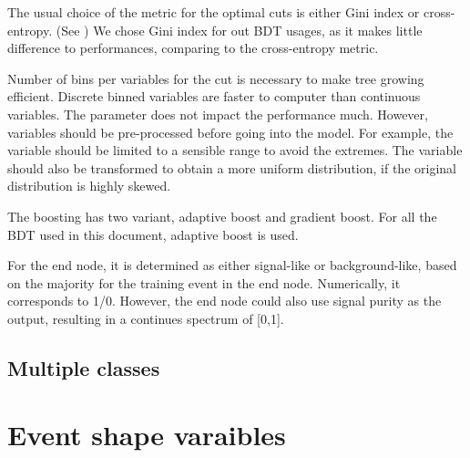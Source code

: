 The usual choice of the metric for the optimal cuts is either Gini index or cross-entropy. (See ) We chose Gini index for out BDT usages, as it makes little difference to performances, comparing to the cross-entropy metric.

Number of bins per variables for the cut is necessary to make tree growing efficient. Discrete binned variables are faster to computer than continuous variables. The parameter does not impact the performance much. However, variables should be pre-processed before going into the model. For example, the variable should be limited to a sensible range to avoid the extremes. The variable should also be transformed to obtain a more uniform distribution, if the original distribution is highly skewed.

The boosting has two variant, adaptive boost and gradient boost. For all the BDT used in this document, adaptive boost is used.

For the end node, it is determined as either signal-like or background-like, based on the majority for the training event in the end node. Numerically, it corresponds to 1/0. However, the end node could also use signal purity as the output, resulting in a continues spectrum of [0,1].


\subsection{Multiple classes}

\section{Event shape varaibles}

